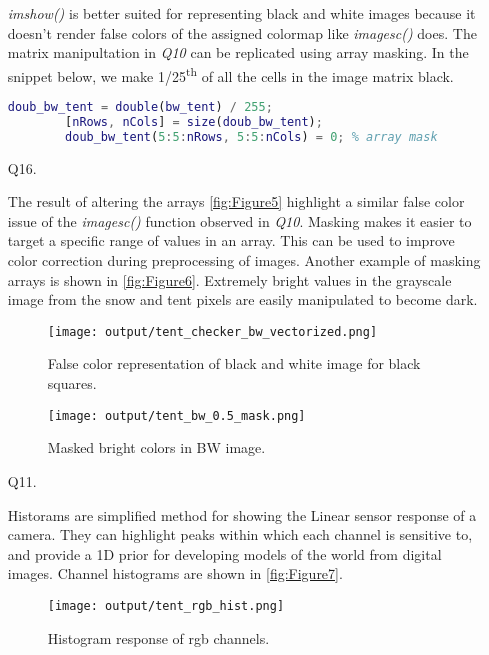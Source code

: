 \documentclass[12pt]{report}
\begin{document}
\begin{enumerate}
    \emph{imshow()} is better suited for representing black and white images because it doesn't render 
    false colors of the assigned colormap like \emph{imagesc()} does. The matrix manipultation in \emph{Q10}
    can be replicated using array masking. In the snippet below, we make 1/25\textsuperscript{th} of all
    the cells in the image matrix black.

    \begin{lstlisting}[language=Matlab]
        doub_bw_tent = double(bw_tent) / 255;
        [nRows, nCols] = size(doub_bw_tent);
        doub_bw_tent(5:5:nRows, 5:5:nCols) = 0; % array mask
    \end{lstlisting}

    \item[Q16.]

    The result of altering the arrays \autoref{fig:Figure5} highlight a similar false color issue of the 
    \emph{imagesc()} function observed in \emph{Q10}. Masking makes it easier to target a specific range
    of values in an array. This can be used to improve color correction during preprocessing of images.
    Another example of masking arrays is shown in \autoref{fig:Figure6}. Extremely bright values in the 
    grayscale image from the snow and tent pixels are easily manipulated to become dark. 

    \begin{figure}[ht!]
        \texttt{[image: output/tent\_checker\_bw\_vectorized.png]}
        \centering
        \caption{False color representation of black and white image for black squares.}
        \label{fig:Figure5}
    \end{figure}

    \begin{figure}[ht!]
        \texttt{[image: output/tent\_bw\_0.5\_mask.png]}
        \centering
        \caption{Masked bright colors in BW image.}
        \label{fig:Figure6}
    \end{figure}

    \item[Q11.]

    Historams are simplified method for showing the Linear sensor response of a camera. They can highlight 
    peaks within which each channel is sensitive to, and provide a 1D prior for developing models of the 
    world from digital images. Channel histograms are shown in \autoref{fig:Figure7}.
    
    \begin{figure}[ht!]
        \texttt{[image: output/tent\_rgb\_hist.png]}
        \centering
        \caption{Histogram response of rgb channels.}
        \label{fig:Figure7}
    \end{figure}


\end{enumerate}
\end{document}

